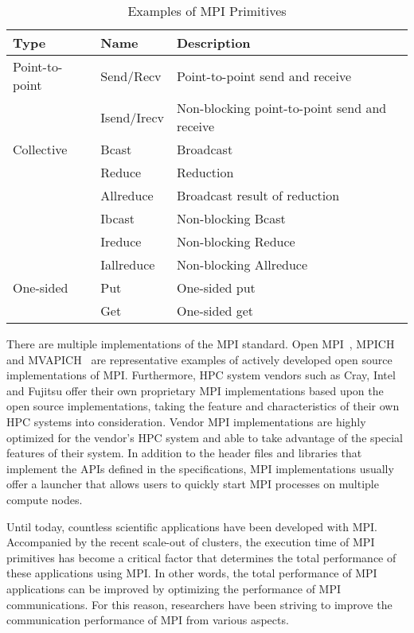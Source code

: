 \begin{table}
    \centering
    \caption{Examples of MPI Primitives}%
    \label{tbl:mpi-primitives}
\begin{tabular}{@{}lll@{}}
\toprule
Type           & Name        & Description \\ \midrule
Point-to-point & Send/Recv   & Point-to-point send and receive              \\
               & Isend/Irecv & Non-blocking point-to-point send and receive \\
\midrule
Collective     & Bcast       & Broadcast                                    \\
               & Reduce      & Reduction                                    \\
               & Allreduce   & Broadcast result of reduction                \\
               & Ibcast      & Non-blocking Bcast                           \\
               & Ireduce     & Non-blocking Reduce                          \\
               & Iallreduce  & Non-blocking Allreduce                       \\
\midrule
One-sided      & Put         & One-sided put                                \\
               & Get         & One-sided get                                \\
\bottomrule
\end{tabular}
\end{table}

There are multiple implementations of the MPI standard. Open
MPI~\cite{Squyres2005}, MPICH~\cite{Gropp2002} and MVAPICH~\cite{mvapich} are
representative examples of
actively developed open source implementations of MPI\@.
Furthermore, HPC system vendors such as Cray, Intel and Fujitsu offer their
own proprietary MPI implementations based upon the open source
implementations, taking the feature and characteristics of their own HPC
systems into consideration. Vendor MPI implementations are highly optimized
for the vendor's HPC system and able to take advantage of the special features
of their system. In addition to the header files and libraries that implement
the APIs defined in the specifications, MPI implementations usually offer a
launcher that allows users to quickly start MPI processes on multiple compute
nodes.

Until today, countless scientific applications have been developed with MPI\@.
Accompanied by the recent scale-out of clusters, the execution time of MPI
primitives has become a critical factor that determines the total performance
of these applications using MPI\@. In other words, the total performance of
MPI applications can be improved by optimizing the performance of MPI
communications. For this reason, researchers have been striving to improve the
communication performance of MPI from various aspects.

